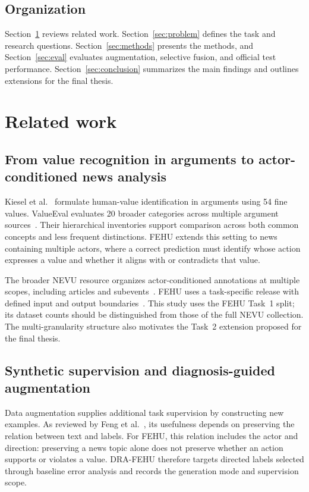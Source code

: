 \documentclass[12pt,a4paper]{article}
\begin{document}
\subsection{Organization}
Section~\ref{sec:related} reviews related work. Section~\ref{sec:problem} defines the task and research questions. Section~\ref{sec:methods} presents the methods, and Section~\ref{sec:eval} evaluates augmentation, selective fusion, and official test performance. Section~\ref{sec:conclusion} summarizes the main findings and outlines extensions for the final thesis.

\sectionbreak
\section{Related work}\label{sec:related}
\subsection{From value recognition in arguments to actor-conditioned news analysis}
Kiesel et al.~\cite{kiesel2022} formulate human-value identification in arguments using 54 fine values. ValueEval evaluates 20 broader categories across multiple argument sources~\cite{valueeval}. Their hierarchical inventories support comparison across both common concepts and less frequent distinctions. FEHU extends this setting to news containing multiple actors, where a correct prediction must identify whose action expresses a value and whether it aligns with or contradicts that value.

The broader NEVU resource organizes actor-conditioned annotations at multiple scopes, including articles and subevents~\cite{nevu}. FEHU uses a task-specific release with defined input and output boundaries~\cite{fehuoverview}. This study uses the FEHU Task~1 split; its dataset counts should be distinguished from those of the full NEVU collection. The multi-granularity structure also motivates the Task~2 extension proposed for the final thesis.


\subsection{Synthetic supervision and diagnosis-guided augmentation}
Data augmentation supplies additional task supervision by constructing new examples. As reviewed by Feng et al.~\cite{feng2021}, its usefulness depends on preserving the relation between text and labels. For FEHU, this relation includes the actor and direction: preserving a news topic alone does not preserve whether an action supports or violates a value. DRA-FEHU therefore targets directed labels selected through baseline error analysis and records the generation mode and supervision scope.
\end{document}
